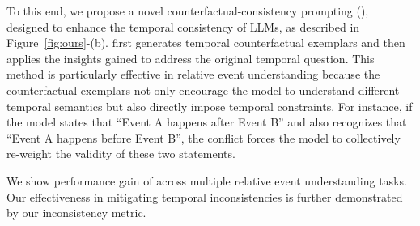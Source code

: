To this end, we propose a novel counterfactual-consistency prompting (\ours), designed to enhance the temporal consistency of LLMs, as described in Figure~\ref{fig:ours}-(b). \ours first generates temporal counterfactual exemplars and then applies the insights gained to address the original temporal question.
This method is particularly effective in relative event understanding because the counterfactual exemplars not only encourage the model to understand different temporal semantics but also directly impose temporal constraints.
For instance, if the model states that ``Event A happens after Event B'' and also recognizes that ``Event A happens before Event B'', the conflict forces the model to collectively re-weight the validity of these two statements.

We show performance gain of \ours across multiple relative event understanding tasks. Our effectiveness in mitigating temporal inconsistencies is further demonstrated by our inconsistency metric.

